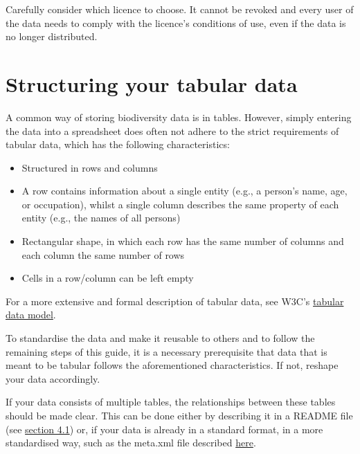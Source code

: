\documentclass[
  oneside]{book}
\begin{document}
\begin{infobox}

Carefully consider which licence to choose. It cannot be revoked and every user of the data needs to comply with the licence's conditions of use, even if the data is no longer distributed.

\end{infobox}

\section{Structuring your tabular data}\label{structuring-your-tabular-data}

A common way of storing biodiversity data is in tables. However, simply entering the data into a spreadsheet does often not adhere to the strict requirements of tabular data, which has the following characteristics:

\begin{itemize}
\item
  Structured in rows and columns
\item
  A row contains information about a single entity (e.g., a person's name, age, or occupation), whilst a single column describes the same property of each entity (e.g., the names of all persons)
\item
  Rectangular shape, in which each row has the same number of columns and each column the same number of rows
\item
  Cells in a row/column can be left empty
\end{itemize}

For a more extensive and formal description of tabular data, see W3C's \href{https://www.w3.org/TR/tabular-data-model/}{tabular data model}.

To standardise the data and make it reusable to others and to follow the remaining steps of this guide, it is a necessary prerequisite that data that is meant to be tabular follows the aforementioned characteristics. If not, reshape your data accordingly.

\begin{infobox}

If your data consists of multiple tables, the relationships between these tables should be made clear. This can be done either by describing it in a README file (see \hyperref[describe-data]{section 4.1}) or, if your data is already in a standard format, in a more standardised way, such as the meta.xml file described \hyperref[structural-metadata]{here}.

\end{infobox}
\end{document}
